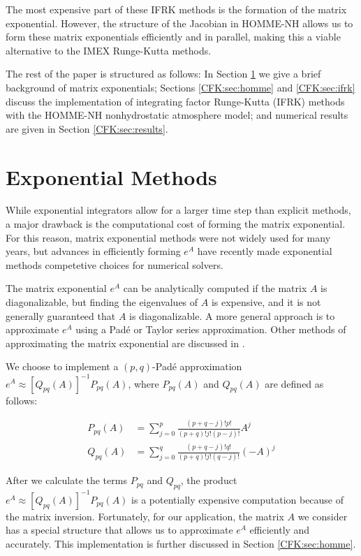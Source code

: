 \documentclass{csri19}
\begin{document}
The most expensive part of these IFRK methods is the formation of the 
matrix exponential. However, the structure of the Jacobian in HOMME-NH 
allows us to form these matrix exponentials efficiently and in parallel, 
making this a viable alternative to the IMEX Runge-Kutta methods.

The rest of the paper is structured as follows: In Section 
\ref{CFK:sec:matexp} we give a brief background of matrix exponentials; 
Sections \ref{CFK:sec:homme} and \ref{CFK:sec:ifrk} discuss the
implementation of integrating factor Runge-Kutta (IFRK) methods with the
HOMME-NH nonhydrostatic atmosphere model; and numerical results are given 
in Section \ref{CFK:sec:results}.

\section{Exponential Methods}\label{CFK:sec:matexp} 
While exponential integrators allow for a larger time step than explicit 
methods, a major drawback is the computational cost of forming the matrix
exponential. For this reason, matrix exponential methods were not widely 
used for many years, but advances in efficiently forming $e^A$ have 
recently made exponential methods competetive choices for numerical solvers.

The matrix exponential $e^A$ can be analytically computed if the matrix $A$
 is diagonalizable, but finding the eigenvalues of $A$ is expensive, and it
 is not generally guaranteed that $A$ is diagonalizable. A more general 
approach is to approximate $e^{A}$ using a Pad\'e or Taylor series 
approximation. Other methods of approximating the matrix exponential are 
discussed in \cite{CFK:Moler2003}.

We choose to implement a $(p,q)$-Pad\'e approximation 
$e^{A}\approx \left[Q_{pq}(A)\right]^{-1}P_{pq}(A)$, where $P_{pq}(A)$ and 
$Q_{pq}(A)$ are defined as follows:

\begin{align*}
P_{pq}(A) &= \sum_{j=0}^p\frac{(p+q-j)!p!}{(p+q)!j!(p-j)!}A^j\\
Q_{pq}(A) &= \sum_{j=0}^q\frac{(p+q-j)!q!}{(p+q)!j!(q-j)!}(-A)^j
\end{align*}

After we calculate the terms $P_{pq}$ and $Q_{pq}$, the product 
$e^A\approx\left[Q_{pq}(A)\right]^{-1}P_{pq}(A)$ is a potentially 
expensive computation because of the matrix inversion. Fortunately, for our
 application, the matrix $A$ we consider has a special structure that allows
us to approximate $e^A$ efficiently and accurately. This implementation is 
further discussed in Section \ref{CFK:sec:homme}.
\end{document}
